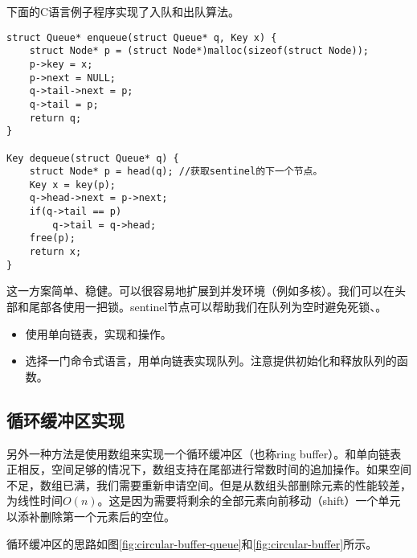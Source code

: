 \documentclass[UTF8]{article}
\begin{document}
下面的C语言例子程序实现了入队和出队算法。

\begin{lstlisting}
struct Queue* enqueue(struct Queue* q, Key x) {
    struct Node* p = (struct Node*)malloc(sizeof(struct Node));
    p->key = x;
    p->next = NULL;
    q->tail->next = p;
    q->tail = p;
    return q;
}

Key dequeue(struct Queue* q) {
    struct Node* p = head(q); //获取sentinel的下一个节点。
    Key x = key(p);
    q->head->next = p->next;
    if(q->tail == p)
        q->tail = q->head;
    free(p);
    return x;
}
\end{lstlisting}

这一方案简单、稳健。可以很容易地扩展到并发环境（例如多核）。我们可以在头部和尾部各使用一把锁。sentinel节点可以帮助我们在队列为空时避免死锁\cite{PODC96}、\cite{SutterDDJ}。

\begin{Exercise}
\begin{itemize}
\item 使用单向链表，实现和操作。

\item 选择一门命令式语言，用单向链表实现队列。注意提供初始化和释放队列的函数。
\end{itemize}
\end{Exercise}

\subsection{循环缓冲区实现}

另外一种方法是使用数组来实现一个循环缓冲区（也称ring buffer）。和单向链表正相反，空间足够的情况下，数组支持在尾部进行常数时间的追加操作。如果空间不足，数组已满，我们需要重新申请空间。但是从数组头部删除元素的性能较差，为线性时间$O(n)$。这是因为需要将剩余的全部元素向前移动（shift）一个单元以添补删除第一个元素后的空位。

循环缓冲区的思路如图\ref{fig:circular-buffer-queue}和\ref{fig:circular-buffer}所示。
\end{document}
